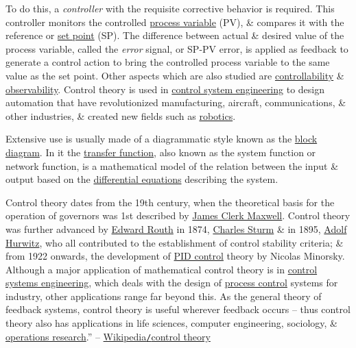 \documentclass{article}
\begin{document}
To do this, a {\it controller} with the requisite corrective behavior is required. This controller monitors the controlled \href{https://en.wikipedia.org/wiki/Process_variable}{process variable} (PV), \& compares it with the reference or \href{https://en.wikipedia.org/wiki/Setpoint_(control_system)}{set point} (SP). The difference between actual \& desired value of the process variable, called the {\it error} signal, or SP-PV error, is applied as feedback to generate a control action to bring the controlled process variable to the same value as the set point. Other aspects which are also studied are \href{https://en.wikipedia.org/wiki/Controllability}{controllability} \& \href{https://en.wikipedia.org/wiki/Observability}{observability}. Control theory is used in \href{https://en.wikipedia.org/wiki/Control_system_engineering}{control system engineering} to design automation that have revolutionized manufacturing, aircraft, communications, \& other industries, \& created new fields such as \href{https://en.wikipedia.org/wiki/Robotics}{robotics}.

Extensive use is usually made of a diagrammatic style known as the \href{https://en.wikipedia.org/wiki/Block_diagram}{block diagram}. In it the \href{https://en.wikipedia.org/wiki/Transfer_function}{transfer function}, also known as the system function or network function, is a mathematical model of the relation between the input \& output based on the \href{https://en.wikipedia.org/wiki/Differential_equation}{differential equations} describing the system.

Control theory dates from the 19th century, when the theoretical basis for the operation of governors was 1st described by \href{https://en.wikipedia.org/wiki/James_Clerk_Maxwell}{James Clerk Maxwell}. Control theory was further advanced by \href{https://en.wikipedia.org/wiki/Edward_Routh}{Edward Routh} in 1874, \href{https://en.wikipedia.org/wiki/Jacques_Charles_Fran%C3%A7ois_Sturm}{Charles Sturm} \& in 1895, \href{https://en.wikipedia.org/wiki/Adolf_Hurwitz}{Adolf Hurwitz}, who all contributed to the establishment of control stability criteria; \& from 1922 onwards, the development of \href{https://en.wikipedia.org/wiki/PID_control}{PID control} theory by Nicolas Minorsky. Although a major application of mathematical control theory is in \href{https://en.wikipedia.org/wiki/Control_Systems_Engineering}{control systems engineering}, which deals with the design of \href{https://en.wikipedia.org/wiki/Process_control}{process control} systems for industry, other applications range far beyond this. As the general theory of feedback systems, control theory is useful wherever feedback occurs -- thus control theory also has applications in life sciences, computer engineering, sociology, \& \href{https://en.wikipedia.org/wiki/Operations_research}{operations research}.'' -- \href{https://en.wikipedia.org/wiki/Control_theory}{Wikipedia{\tt/}control theory}
\end{document}
